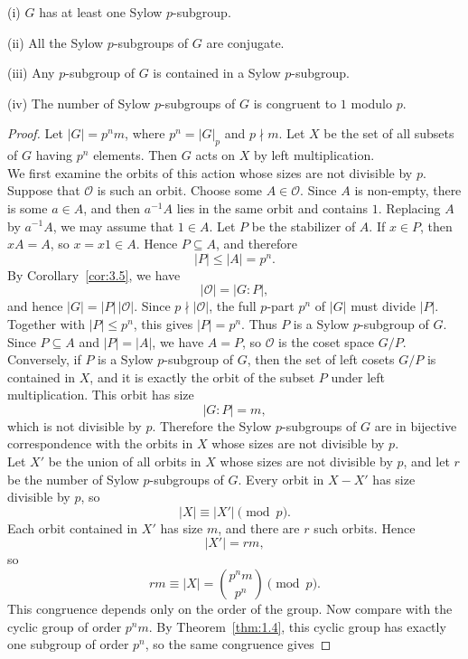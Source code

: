 \documentclass[../Odyssey_Project.tex]{subfiles}
\begin{document}
\begin{namedtheorem}
\label{thm:sylow}
(i) $G$ has at least one Sylow $p$-subgroup.

(ii) All the Sylow $p$-subgroups of $G$ are conjugate.

(iii) Any $p$-subgroup of $G$ is contained in a Sylow $p$-subgroup.

(iv) The number of Sylow $p$-subgroups of $G$ is congruent to $1$ modulo $p$.
\end{namedtheorem}
\begin{proof}
Let $|G| = p^n m$, where $p^n = |G|_p$ and $p\nmid m$. Let $X$ be the set of all subsets of $G$ having $p^n$ elements. Then $G$ acts on $X$ by left multiplication.\\
We first examine the orbits of this action whose sizes are not divisible by $p$. Suppose that $\mathcal{O}$ is such an orbit. Choose some $A \in \mathcal{O}$. Since $A$ is non-empty, there is some $a \in A$, and then $a^{-1}A$ lies in the same orbit and contains $1$. Replacing $A$ by $a^{-1}A$, we may assume that $1 \in A$. Let $P$ be the stabilizer of $A$. If $x \in P$, then $xA = A$, so $x = x1 \in A$. Hence $P \subseteq A$, and therefore
\[
    |P| \leq |A| = p^n.
\]
By Corollary~\ref{cor:3.5}, we have
\[
    |\mathcal{O}| = |G : P|,
\]
and hence $|G| = |P|\,|\mathcal{O}|$. Since $p\nmid |\mathcal{O}|$, the full $p$-part $p^n$ of $|G|$ must divide $|P|$. Together with $|P|\leq p^n$, this gives $|P|=p^n$. Thus $P$ is a Sylow $p$-subgroup of $G$. Since $P \subseteq A$ and $|P|=|A|$, we have $A=P$, so $\mathcal{O}$ is the coset space $G/P$.\\
Conversely, if $P$ is a Sylow $p$-subgroup of $G$, then the set of left cosets $G/P$ is contained in $X$, and it is exactly the orbit of the subset $P$ under left multiplication. This orbit has size
\[
    |G : P| = m,
\]
which is not divisible by $p$. Therefore the Sylow $p$-subgroups of $G$ are in bijective correspondence with the orbits in $X$ whose sizes are not divisible by $p$.\\
Let $X'$ be the union of all orbits in $X$ whose sizes are not divisible by $p$, and let $r$ be the number of Sylow $p$-subgroups of $G$. Every orbit in $X-X'$ has size divisible by $p$, so
\[
    |X| \equiv |X'| \pmod{p}.
\]
Each orbit contained in $X'$ has size $m$, and there are $r$ such orbits. Hence
\[
    |X'| = rm,
\]
so
\[
    rm \equiv |X| = \binom{p^n m}{p^n} \pmod{p}.
\]
This congruence depends only on the order of the group. Now compare with the cyclic group of order $p^n m$. By Theorem~\ref{thm:1.4}, this cyclic group has exactly one subgroup of order $p^n$, so the same congruence gives

\end{proof}
\end{document}
